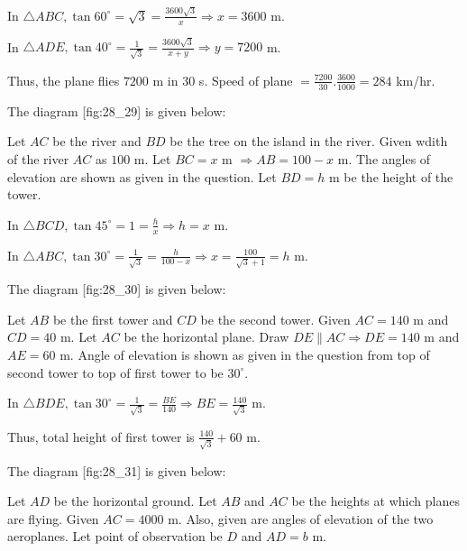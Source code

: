   In $\triangle ABC, \tan60^\circ = \sqrt{3} = \frac{3600\sqrt{3}}{x} \Rightarrow x = 3600$ m.

  In $\triangle ADE, \tan40^\circ = \frac{1}{\sqrt{3}} = \frac{3600\sqrt{3}}{x + y} \Rightarrow y = 7200$ m.

  Thus, the plane flies $7200$ m in $30$ s. Speed of plane $= \frac{7200}{30}.\frac{3600}{1000} = 284$ km/hr.

\item The diagram [fig:28_29] is given below:

  \startplacefigure[reference=fig:28_29]
    \externalfigure[28_29.pdf]
  \stopplacefigure

  Let $AC$ be the river and $BD$ be the tree on the island in the river. Given wdith of the river $AC$ as
  $100$ m. Let $BC = x$ m $\Rightarrow AB = 100 - x$ m. The angles of elevation are shown as given in the
  question. Let $BD = h$ m be the height of the tower.

  In $\triangle BCD, \tan45^\circ = 1 = \frac{h}{x} \Rightarrow h = x$ m.

  In $\triangle ABC, \tan30^\circ = \frac{1}{\sqrt{3}} = \frac{h}{100 - x} \Rightarrow x = \frac{100}{\sqrt{3} + 1} = h$ m.

\item The diagram [fig:28_30] is given below:

  \startplacefigure[reference=fig:28_30]
    \externalfigure[28_30.pdf]
  \stopplacefigure

  Let $AB$ be the first tower and $CD$ be the second tower. Given $AC = 140$ m and $CD = 40$ m. Let
  $AC$ be the horizontal plane. Draw $DE\parallel AC \Rightarrow DE = 140$ m and $AE = 60$ m. Angle of elevation
  is shown as given in the question from top of second tower to top of first tower to be $30^\circ$.

  In $\triangle BDE, \tan30^\circ = \frac{1}{\sqrt{3}} = \frac{BE}{140} \Rightarrow BE = \frac{140}{\sqrt{3}}$ m.

  Thus, total height of first tower is $\frac{140}{\sqrt{3}} + 60$ m.

\item The diagram [fig:28_31] is given below:

  \startplacefigure[reference=fig:28_31]
    \externalfigure[28_31.pdf]
  \stopplacefigure

  Let $AD$ be the horizontal ground. Let $AB$ and $AC$ be the heights at which planes are flying. Given
  $AC = 4000$ m. Also, given are angles of elevation of the two aeroplanes. Let point of observation be $D$ and
  $AD = b$ m.

